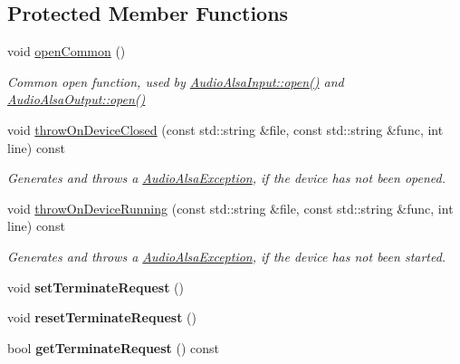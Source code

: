 \subsection*{Protected Member Functions}
\begin{DoxyCompactItemize}
\item 
void \hyperlink{group__Audio_ga412c7a2b30dfb3b1b49ce63b7e84eb52}{open\-Common} ()
\begin{DoxyCompactList}\small\item\em Common open function, used by \hyperlink{classNl_1_1AudioAlsaInput_a9e3afb8dfb0615d745a4f362302ce99d}{Audio\-Alsa\-Input\-::open()} and \hyperlink{classNl_1_1AudioAlsaOutput_a94792430810853353314a71f1b54a5d3}{Audio\-Alsa\-Output\-::open()} \end{DoxyCompactList}\item 
void \hyperlink{group__Audio_ga409e810baf7f4c3f1ff7380b1f979721}{throw\-On\-Device\-Closed} (const std\-::string \&file, const std\-::string \&func, int line) const 
\begin{DoxyCompactList}\small\item\em Generates and throws a \hyperlink{classNl_1_1AudioAlsaException}{Audio\-Alsa\-Exception}, if the device has not been opened. \end{DoxyCompactList}\item 
void \hyperlink{group__Audio_ga96f03f2ab93bf0caec1ca9dc9fc03d6b}{throw\-On\-Device\-Running} (const std\-::string \&file, const std\-::string \&func, int line) const 
\begin{DoxyCompactList}\small\item\em Generates and throws a \hyperlink{classNl_1_1AudioAlsaException}{Audio\-Alsa\-Exception}, if the device has not been started. \end{DoxyCompactList}\item 
\hypertarget{classNl_1_1AudioAlsa_af19fdd267bd17b21c0961cf6c17038c1}{void {\bfseries set\-Terminate\-Request} ()}\label{classNl_1_1AudioAlsa_af19fdd267bd17b21c0961cf6c17038c1}

\item 
\hypertarget{classNl_1_1AudioAlsa_aad8b3bce72a0812a4878d007006cd767}{void {\bfseries reset\-Terminate\-Request} ()}\label{classNl_1_1AudioAlsa_aad8b3bce72a0812a4878d007006cd767}

\item 
\hypertarget{classNl_1_1AudioAlsa_ac59db37cfc168cca3cad339b73798f6a}{bool {\bfseries get\-Terminate\-Request} () const }\label{classNl_1_1AudioAlsa_ac59db37cfc168cca3cad339b73798f6a}


\end{DoxyCompactItemize}
